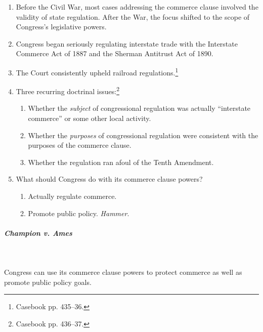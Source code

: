 \begin{enumerate}
    \item Before the Civil War, most cases addressing the commerce clause 
    involved the validity of state regulation. After the War, the focus 
    shifted to the scope of Congress's legislative powers.
    \item Congress began seriously regulating interstate trade with the 
    Interstate Commerce Act of 1887 and the Sherman Antitrust Act of 1890.
    \item The Court consistently upheld railroad 
    regulations.\footnote{Casebook pp. 435--36.}
    \item Three recurring doctrinal issues:\footnote{Casebook pp. 436--37.}
    \begin{enumerate}
        \item Whether the \emph{subject} of congressional regulation was 
        actually ``interstate commerce'' or some other local activity.
        \item Whether the \emph{purposes} of congressional regulation were 
        consistent with the purposes of the commerce clause.
        \item Whether the regulation ran afoul of the Tenth Amendment.
    \end{enumerate}
    \item What should Congress do with its commerce clause powers?\begin{enumerate}
        \item Actually regulate commerce.
        \item Promote public policy. \emph{Hammer}.
    \end{enumerate}
\end{enumerate}

\paragraph{\emph{Champion v. Ames}}
~\\\\
Congress can use its commerce clause powers to protect commerce as well as 
promote public policy goals.

